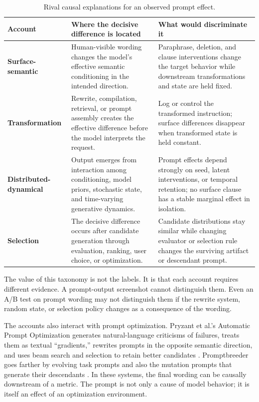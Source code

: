 \documentclass[11pt]{article}
\begin{document}
\begin{table}[ht]
\small
\centering
\begin{tabularx}{\textwidth}{>{\bfseries}p{} X X}
\toprule
Account & Where the decisive difference is located & What would discriminate it \\
\midrule
Surface-semantic & Human-visible wording changes the model's effective semantic conditioning in the intended direction. & Paraphrase, deletion, and clause interventions change the target behavior while downstream transformations and state are held fixed. \\
Transformation & Rewrite, compilation, retrieval, or prompt assembly creates the effective difference before the model interprets the request. & Log or control the transformed instruction; surface differences disappear when transformed state is held constant. \\
Distributed-dynamical & Output emerges from interaction among conditioning, model priors, stochastic state, and time-varying generative dynamics. & Prompt effects depend strongly on seed, latent interventions, or temporal retention; no surface clause has a stable marginal effect in isolation. \\
Selection & The decisive difference occurs after candidate generation through evaluation, ranking, user choice, or optimization. & Candidate distributions stay similar while changing evaluator or selection rule changes the surviving artifact or descendant prompt. \\
\bottomrule
\end{tabularx}
\caption{Rival causal explanations for an observed prompt effect.}
\label{tab:rivals}
\end{table}

The value of this taxonomy is not the labels. It is that each account requires different evidence. A prompt-output screenshot cannot distinguish them. Even an A/B test on prompt wording may not distinguish them if the rewrite system, random state, or selection policy changes as a consequence of the wording.

The accounts also interact with prompt optimization. Pryzant et al.'s Automatic Prompt Optimization generates natural-language criticisms of failures, treats them as textual ``gradients,'' rewrites prompts in the opposite semantic direction, and uses beam search and selection to retain better candidates \citep{Pryzant2023APO}. Promptbreeder goes farther by evolving task prompts and also the mutation prompts that generate their descendants \citep{Fernando2023Promptbreeder}. In these systems, the final wording can be causally downstream of a metric. The prompt is not only a cause of model behavior; it is itself an effect of an optimization environment.
\end{document}
